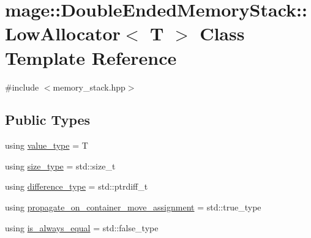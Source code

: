 \hypertarget{classmage_1_1_double_ended_memory_stack_1_1_low_allocator}{}\section{mage\+:\+:Double\+Ended\+Memory\+Stack\+:\+:Low\+Allocator$<$ T $>$ Class Template Reference}
\label{classmage_1_1_double_ended_memory_stack_1_1_low_allocator}


{\ttfamily \#include $<$memory\+\_\+stack.\+hpp$>$}

\subsection*{Public Types}
\begin{DoxyCompactItemize}
\item 
using \mbox{\hyperlink{classmage_1_1_double_ended_memory_stack_1_1_low_allocator_a38357d7dde55731d76644c13e64b03a6}{value\+\_\+type}} = T
\item 
using \mbox{\hyperlink{classmage_1_1_double_ended_memory_stack_1_1_low_allocator_a6fc22a2468eb42c751783ac946c5b852}{size\+\_\+type}} = std\+::size\+\_\+t
\item 
using \mbox{\hyperlink{classmage_1_1_double_ended_memory_stack_1_1_low_allocator_ac676598611fa99d167d57bb9e95f3187}{difference\+\_\+type}} = std\+::ptrdiff\+\_\+t
\item 
using \mbox{\hyperlink{classmage_1_1_double_ended_memory_stack_1_1_low_allocator_ae864e2014f35dc1165e84de06018364b}{propagate\+\_\+on\+\_\+container\+\_\+move\+\_\+assignment}} = std\+::true\+\_\+type
\item 
using \mbox{\hyperlink{classmage_1_1_double_ended_memory_stack_1_1_low_allocator_ab42cfced82fe7790a27d066fe299513b}{is\+\_\+always\+\_\+equal}} = std\+::false\+\_\+type
\end{DoxyCompactItemize}

